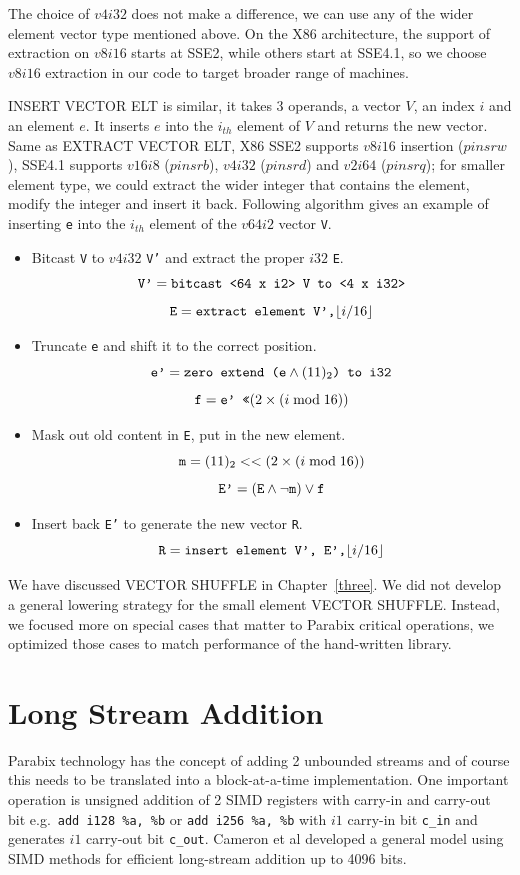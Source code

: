 The choice of $v4i32$ does not make a difference, we can use any of the wider element vector type mentioned above. On the X86 architecture, the support of extraction on $v8i16$ starts at SSE2, while others start at SSE4.1, so we choose $v8i16$ extraction in our code to target broader range of machines.

INSERT VECTOR ELT is similar, it takes 3 operands, a vector $V$, an index $i$ and an element $e$. It inserts $e$ into the $i_{th}$ element of $V$ and returns the new vector. Same as EXTRACT VECTOR ELT, X86 SSE2 supports $v8i16$ insertion ($pinsrw$), SSE4.1 supports $v16i8$ ($pinsrb$), $v4i32$ ($pinsrd$) and $v2i64$ ($pinsrq$); for smaller element type, we could extract the wider integer that contains the element, modify the integer and insert it back. Following algorithm gives an example of inserting {\tt e} into the $i_{th}$ element of the $v64i2$ vector {\tt V}.

\begin{itemize}
  \item Bitcast {\tt V} to $v4i32$ {\tt V'} and extract the proper $i32$ {\tt E}.
  \[\text{\tt V'} = \text{\tt bitcast <64 x i2> V to <4 x i32>} \]
  \[\text{\tt E} = \text{\tt extract element V',} \lfloor i / 16 \rfloor \]

  \item Truncate {\tt e} and shift it to the correct position.
  \[\text{\tt e'} = \text{\tt zero extend (e} \land (11)_2 \text{\tt ) to i32} \]
  \[\text{\tt f} = \text{\tt e' <<} (2 \times (i \bmod 16))\]

  \item Mask out old content in {\tt E}, put in the new element.
  \[\text{\tt m} = (11)_2 << (2 \times (i \bmod 16)) \]
  \[\text{\tt E'} = (\text{\tt E} \land \lnot \text{\tt m}) \lor \text{\tt f}\]

  \item Insert back {\tt E'} to generate the new vector {\tt R}.
  \[\text{\tt R} = \text{\tt insert element V', E',} \lfloor i / 16 \rfloor \]
\end{itemize}

We have discussed VECTOR SHUFFLE in Chapter~\ref{three}. We did not develop a general lowering strategy for the small element VECTOR SHUFFLE\@. Instead, we focused more on special cases that matter to Parabix critical operations, we optimized those cases to match performance of the hand-written library.

\section{Long Stream Addition}
Parabix technology has the concept of adding 2 unbounded streams and of course this needs to be translated into a block-at-a-time implementation\cite{rob_regex}. One important operation is unsigned addition of 2 SIMD registers with carry-in and carry-out bit e.g.\ \verb|add i128 %a, %b| or \verb|add i256 %a, %b| with $i1$ carry-in bit \verb:c_in: and generates $i1$ carry-out bit \verb:c_out:. Cameron et al\cite{rob_regex} developed a general model using SIMD methods for efficient long-stream addition up to 4096 bits.

